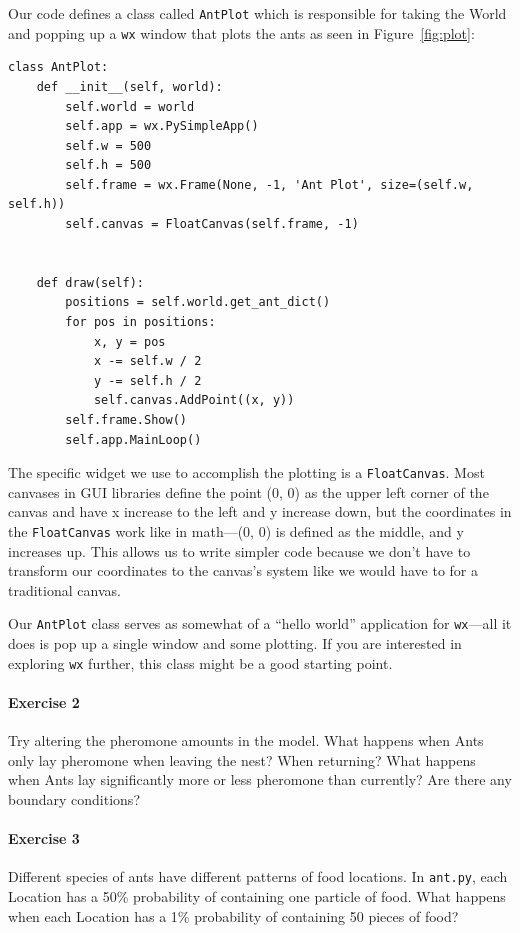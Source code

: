 Our code defines a class called \texttt{AntPlot} which is responsible for taking the World and popping up a \texttt{wx} window that plots the ants as seen in Figure~\ref{fig:plot}:

\begin{verbatim}
class AntPlot:
    def __init__(self, world):
        self.world = world
        self.app = wx.PySimpleApp()
        self.w = 500
        self.h = 500
        self.frame = wx.Frame(None, -1, 'Ant Plot', size=(self.w, self.h))
        self.canvas = FloatCanvas(self.frame, -1)
        
    
    def draw(self):
        positions = self.world.get_ant_dict()
        for pos in positions:
            x, y = pos
            x -= self.w / 2
            y -= self.h / 2
            self.canvas.AddPoint((x, y))
        self.frame.Show()
        self.app.MainLoop()
\end{verbatim}

The specific widget we use to accomplish the plotting is a \texttt{FloatCanvas}. Most canvases in GUI libraries define the point (0, 0) as the upper left corner of the canvas and have x increase to the left and y increase down, but the coordinates in the \texttt{FloatCanvas} work like in math---(0, 0) is defined as the middle, and y increases up. This allows us to write simpler code because we don't have to transform our coordinates to the canvas's system like we would have to for a traditional canvas.

Our \texttt{AntPlot} class serves as somewhat of a ``hello world'' application for \texttt{wx}---all it does is pop up a single window and some plotting. If you are interested in exploring \texttt{wx} further, this class might be a good starting point.


\paragraph{Exercise 2}
Try altering the pheromone amounts in the model.  What happens when Ants only lay pheromone when leaving the nest? When returning? What happens when Ants lay significantly more or less pheromone than currently? Are there any boundary conditions?
\paragraph{Exercise 3}
Different species of ants have different patterns of food locations. In \texttt{ant.py}, each Location has a 50\% probability of containing one particle of food.  What happens when each Location has a 1\% probability of containing 50 pieces of food?

